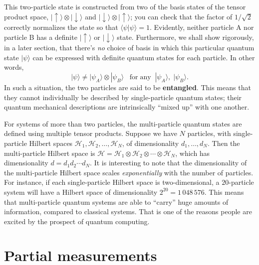 \documentclass[pra,11pt]{revtex4}
\begin{document}
This two-particle state is constructed from two of the basis states of
the tensor product space,
$|\!\uparrow\rangle\otimes|\!\downarrow\rangle$ and
$|\!\downarrow\rangle\otimes|\!\uparrow\rangle$; you can check that
the factor of $1/\sqrt{2}$ correctly normalizes the state so that
$\langle\psi|\psi\rangle = 1$.  Evidently, neither particle A nor
particle B has a definite $|\!\uparrow\rangle$ or
$|\!\downarrow\rangle$ state.  Furthermore, we shall show rigorously,
in a later section, that there's \textit{no} choice of basis in which this
particular quantum state $|\psi\rangle$ can be expressed with
definite quantum states for each particle.  In other words,
$$|\psi\rangle \ne |\psi_A\rangle\otimes|\psi_B\rangle \;\;\;\textrm{for}\;\textrm{any}\;\; |\psi_A\rangle, \;|\psi_B\rangle.$$
In such a situation, the two particles are said to be
\textbf{entangled}.  This means that they cannot individually be
described by single-particle quantum states; their quantum
mechanical descriptions are intrinsically ``mixed up'' with one another.

For systems of more than two particles, the multi-particle quantum
states are defined using multiple tensor products.  Suppose we have
$N$ particles, with single-particle Hilbert spaces $\mathscr{H}_1,
\mathscr{H}_2, \dots, \mathscr{H}_N$, of dimensionality $d_1, \dots,
d_N$.  Then the multi-particle Hilbert space is $\mathscr{H} =
\mathscr{H}_1 \otimes \mathscr{H}_2 \otimes \cdots \otimes
\mathscr{H}_N$, which has dimensionality $d = d_1 d_2\cdots d_N$.  It
is interesting to note that the dimensionality of the multi-particle
Hilbert space scales \textit{exponentially} with the number of
particles.  For instance, if each single-particle Hilbert space is
two-dimensional, a $20$-particle system will have a Hilbert space of
dimensionality $2^{20} =1\,048\,576$.  This means that multi-particle
quantum systems are able to ``carry'' huge amounts of information,
compared to classical systems.  That is one of the reasons people are
excited by the prospect of quantum computing.

\section{Partial measurements}
\end{document}
